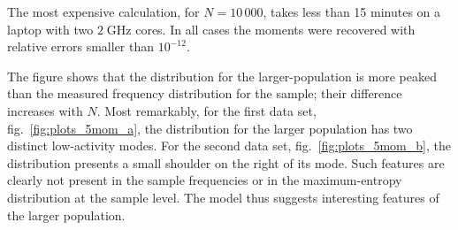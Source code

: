 \documentclass[\ifafour a4paper,12pt,\else a5paper,10pt,\fi%
onecolumn,oneside,article,%
british%
]{memoir}
\theoremstyle{remark}
\theoremstyle{innote}
\renewcommand*{\|}{\nonscript\,\vert\nonscript\;\mathopen{}}
\newcommand*{\fig}{fig.}%
\begin{document}
The most expensive calculation, for $N=10\,000$, takes less than 15 minutes
on a laptop with two $2\;\textrm{GHz}$ cores. In all cases the moments were
recovered with relative errors smaller than $10^{-12}$.

The figure shows that the distribution for the larger-population is more
peaked than the measured frequency distribution for the sample; their
difference increases with $N$. Most remarkably, for the first data set,
\fig~\ref{fig:plots_5mom_a}, the distribution for the larger population has
two distinct low-activity modes. For the second data set,
\fig~\ref{fig:plots_5mom_b}, the distribution presents a small shoulder on
the right of its mode.
Such features are clearly not present in the sample frequencies or in the
maximum-entropy distribution at the sample level. The model thus suggests
interesting features of the larger population. \textcolor{white}{If you
  find this you can claim a postcard from us.}
\end{document}
